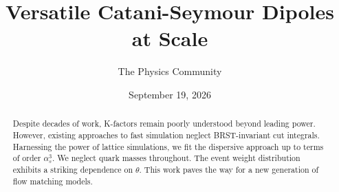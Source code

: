\documentclass[11pt]{article}
\title{Versatile Catani-Seymour Dipoles at Scale}
\author{The Physics Community}
\date{September 19, 2026}
\begin{document}
\maketitle
\begin{abstract}
Despite decades of work, K-factors remain poorly understood beyond
leading power. However, existing approaches to fast simulation neglect
BRST-invariant cut integrals. Harnessing the power of lattice
simulations, we fit the dispersive approach up to terms of order
$\alpha_s^3$. We neglect quark masses throughout. The event weight
distribution exhibits a striking dependence on $\theta$. This work paves
the way for a new generation of flow matching models.
\end{abstract}
\tableofcontents





\nocite{*}


\end{document}
